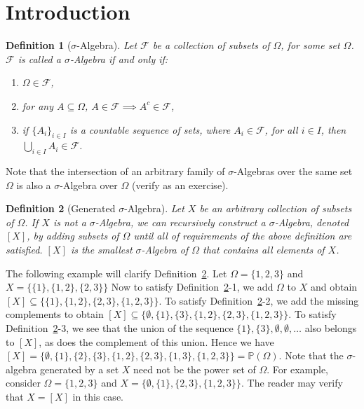 \documentclass[10pt, oneside]{article}
\newtheorem{defn}{Definition}
\begin{document}
\section{Introduction}
\begin{defn}[$\sigma$-Algebra]
    \label{defn:SA}
    Let $\mathcal{F}$ be a collection of subsets of $\Omega$, for some set $\Omega$.
    $\mathcal{F}$ is called a $\sigma$-Algebra if and only if:
    \begin{enumerate}
        \item $\Omega \in \mathcal{F}$, 
        \item for any $A \subseteq \Omega$, $A \in \mathcal{F} \implies 
            A^{c} \in \mathcal{F}$, 
        \item if $\{A_{i}\}_{i \in I}$ is a countable sequence of sets, where $A_i 
            \in \mathcal{F}$, for all $i \in I$, then $\bigcup_{i \in I}A_{i} \in 
            \mathcal{F}$.  
    \end{enumerate} 
\end{defn} 

Note that the intersection of an arbitrary family of $\sigma$-Algebras over the 
same set $\Omega$ is also a $\sigma$-Algebra over $\Omega$ (verify as an exercise). 

\begin{defn}[Generated $\sigma$-Algebra]
    \label{defn:gen-SA}
    Let $X$ be an arbitrary collection of subsets of $\Omega$. If $X$ is not a 
    $\sigma$-Algebra, we can recursively construct a $\sigma$-Algebra, denoted $[X]$,
    by adding subsets of $\Omega$ until all of requirements of the above definition
    are satisfied. $[X]$ is the smallest $\sigma$-Algebra of $\Omega$ that contains
    all elements of $X$. 
\end{defn}

The following example will clarify Definition~\ref{defn:gen-SA}.
Let $\Omega = \{1,2,3\}$ and $X=\{\{1\},\{1,2\},\{2,3\}\}$
Now to satisfy Definition~\ref{defn:gen-SA}-1, we add $\Omega$ to $X$ and obtain $[X]\subseteq\{\{1\},\{1,2\},\{2,3\},\{1,2,3\}\}$.
To satisfy Definition~\ref{defn:gen-SA}-2, we add the missing complements to obtain $[X]\subseteq\{\emptyset, \{1\},\{3\},\{1,2\},\{2,3\},\{1,2,3\}\}$.
To satisfy Definition~\ref{defn:gen-SA}-3, we see that the union of the sequence $\{1\},\{3\},\emptyset,\emptyset,\ldots$ also belongs to $[X]$, as does the complement of this union. Hence we have $[X]= \{\emptyset, \{1\},\{2\},\{3\},\{1,2\},\{2,3\},\{1,3\},\{1,2,3\}\}=\mathbb{P}(\Omega)$.
Note that the $\sigma$-algebra generated by a set $X$ need not be the power set of $\Omega$.
For example, consider $\Omega=\{1,2,3\}$ and $X=\{\emptyset,\{1\},\{2,3\},\{1,2,3\}\}$.
The reader may verify that $X=[X]$ in this case.
\end{document}

